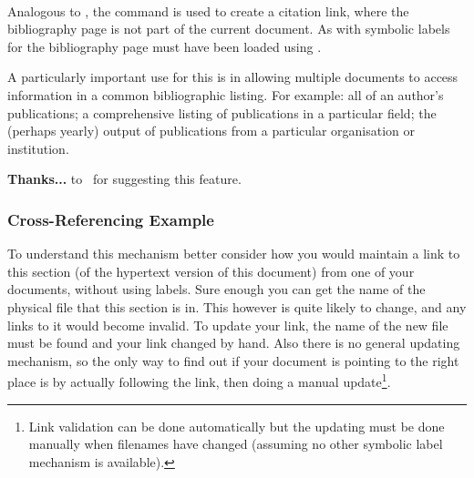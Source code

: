 %
%
\paragraph*{\label{externcite}}
\begin{changebar}
%
Analogous to ,
the  command is used to create a citation link,
where the bibliography page is not part of the current document.
As with  symbolic labels for the bibliography page
must have been loaded using 
.

A particularly important use for this is in allowing multiple documents 
to access information in a common bibliographic listing.
For example: all of an author's publications; 
a comprehensive listing of publications in a particular field; 
the (perhaps yearly) output of publications 
from a particular organisation or institution.

\medskip\noindent
\textbf{Thanks...} to \Engberg\ for suggesting this feature.
\end{changebar}



\subsubsection{Cross-Referencing Example\label{crossrefs}}%
To understand this mechanism better consider 
how you would maintain a link to this section  
(of the hypertext version of this document) from one of your documents,
without using labels.
Sure enough you can get the name of the physical file that this section is in. 
This however is quite likely to change, and any links to it would become invalid. 
%
To update your link, the name of the new file must be found 
and your link changed by hand. 
Also there is no general updating mechanism, so the only way to find
out if your document is pointing to the right place is by actually
following the link, then doing a manual update\footnote{%
Link validation can be done automatically but the updating must be done
manually when filenames have changed (assuming no other symbolic label
mechanism is available).}.

